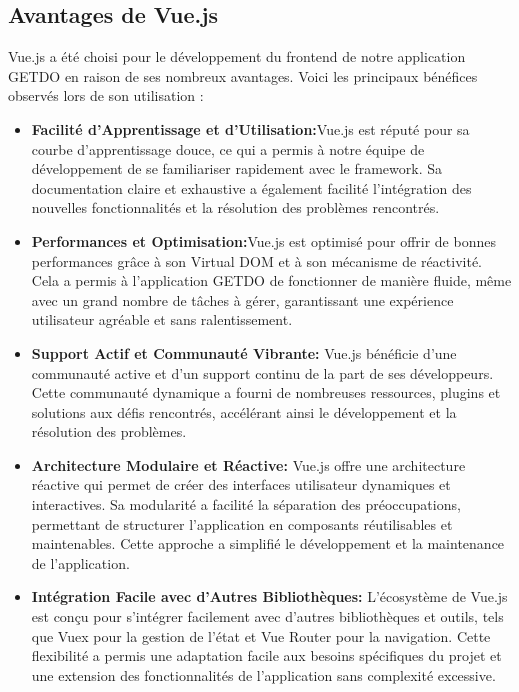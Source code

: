 \documentclass[a4paper,12pt]{report}
\begin{document}
    \subsection{Avantages de Vue.js}
    Vue.js a été choisi pour le développement du frontend de notre application GETDO en raison de ses nombreux avantages. Voici les principaux bénéfices observés lors de son utilisation :
    \begin{itemize}
      \item\textbf{Facilité d'Apprentissage et d'Utilisation:}Vue.js est réputé pour sa courbe d'apprentissage douce, ce qui a permis à notre équipe de développement de se familiariser rapidement avec le framework. Sa documentation claire et exhaustive a également facilité l'intégration des nouvelles fonctionnalités et la résolution des problèmes rencontrés.
      
      \item\textbf{Performances et Optimisation:}Vue.js est optimisé pour offrir de bonnes performances grâce à son Virtual DOM et à son mécanisme de réactivité. Cela a permis à l'application GETDO de fonctionner de manière fluide, même avec un grand nombre de tâches à gérer, garantissant une expérience utilisateur agréable et sans ralentissement.
      
      \item\textbf{Support Actif et Communauté Vibrante:}
      Vue.js bénéficie d'une communauté active et d'un support continu de la part de ses développeurs. Cette communauté dynamique a fourni de nombreuses ressources, plugins et solutions aux défis rencontrés, accélérant ainsi le développement et la résolution des problèmes.
      
      \item\textbf{Architecture Modulaire et Réactive:}
      Vue.js offre une architecture réactive qui permet de créer des interfaces utilisateur dynamiques et interactives. Sa modularité a facilité la séparation des préoccupations, permettant de structurer l'application en composants réutilisables et maintenables. Cette approche a simplifié le développement et la maintenance de l'application.
      
      \item\textbf{Intégration Facile avec d'Autres Bibliothèques:}
      L'écosystème de Vue.js est conçu pour s'intégrer facilement avec d'autres bibliothèques et outils, tels que Vuex pour la gestion de l'état et Vue Router pour la navigation. Cette flexibilité a permis une adaptation facile aux besoins spécifiques du projet et une extension des fonctionnalités de l'application sans complexité excessive.
    \end{itemize}
    
\end{document}
